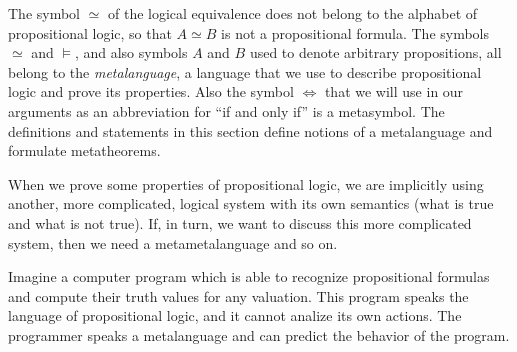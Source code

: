 \begin{rem}
The symbol $\simeq$ of the logical equivalence does not belong to the alphabet of propositional logic, so that $A \simeq B$ is not a propositional formula.
The symbols $\simeq$ and $\vDash$, and also symbols $A$ and $B$ used to denote arbitrary propositions,
all belong to the \emph{metalanguage}, a language that we use to describe propositional logic and prove its properties.
Also the symbol $\Leftrightarrow$ that we will use in our arguments as an abbreviation for ``if and only if'' is a metasymbol.
The definitions and statements in this section define notions of a metalanguage and formulate metatheorems.

When we prove some properties of propositional logic,
we are implicitly using another, more complicated, logical system with its own semantics (what is true and what is not true).
If, in turn, we want to discuss this more complicated system, then we need a metametalanguage and so on.

Imagine a computer program which is able to recognize propositional formulas and compute their truth values for any valuation.
This program speaks the language of propositional logic, and it cannot analize its own actions.
The programmer speaks a metalanguage and can predict the behavior of the program.
\end{rem}